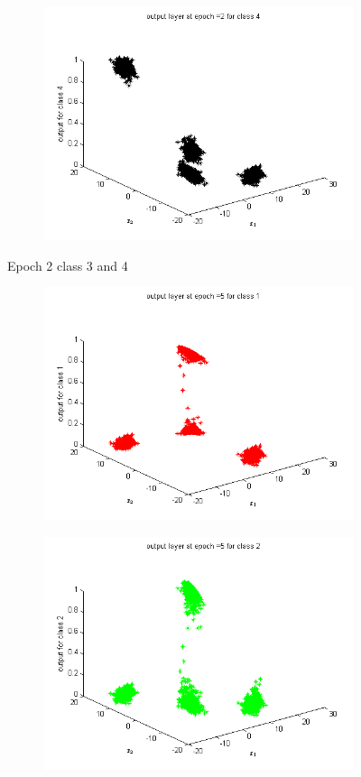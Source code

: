 \documentclass{article}
\begin{document}
\begin{flushleft}
\begin{figure}
\begin{subfigure}{.5\textwidth}
\end{subfigure}%
\begin{subfigure}{.5\textwidth}
  \centering
  \includegraphics[width=.8\linewidth]{Classification/linearlySeparable/2_4}
  
\end{subfigure}
\caption{Epoch 2 class 3 and 4}
\end{figure}

\begin{figure}
\begin{subfigure}{.5\textwidth}
  \centering
  \includegraphics[width=.8\linewidth]{Classification/linearlySeparable/5_1}
 
\end{subfigure}%
\begin{subfigure}{.5\textwidth}
  \centering
  \includegraphics[width=.8\linewidth]{Classification/linearlySeparable/5_2}
  

\end{subfigure}
\end{figure}
\end{flushleft}
\end{document}
